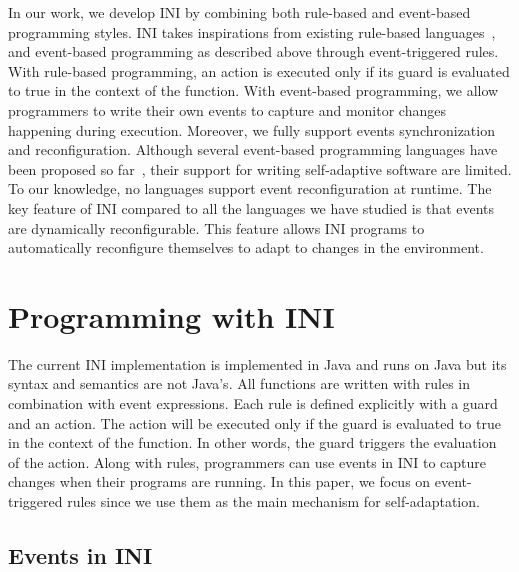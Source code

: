 \documentclass[runningheads,a4paper]{llncs}
\begin{document}
In our work, we develop INI by combining both rule-based and event-based programming styles. INI takes inspirations from existing rule-based languages~\cite{Cirstea2009}, and event-based programming as described above through event-triggered rules. With rule-based programming, an action is executed only if its guard is evaluated to true in the context of the function. With event-based programming, we allow programmers to write their own events to capture and monitor changes happening during execution. Moreover, we fully support events synchronization and reconfiguration. Although several event-based programming languages have been proposed so far~\cite{Fischer2007,Kamina2011}, their support for writing self-adaptive software are limited. To our knowledge, no languages support event reconfiguration at runtime. The key feature of INI compared to all the languages we have studied is that events are dynamically reconfigurable. This feature allows INI programs to automatically reconfigure themselves to adapt to changes in the environment.

\section{Programming with INI} \label{sec:INI}

The current INI implementation is implemented in Java and runs on Java but its syntax and semantics are not Java's. All functions are written with rules in combination with event expressions. Each rule is defined explicitly with a guard and an action. The action will be executed only if the guard is evaluated to true in the context of the function. In other words, the guard triggers the evaluation of the action. Along with rules, programmers can use events in INI to capture changes when their programs are running. In this paper, we focus on event-triggered rules since we use them as the main mechanism for self-adaptation.

\subsection{Events in INI} \label{sec:overviewEvent}

\vspace{-10pt}
\end{document}
